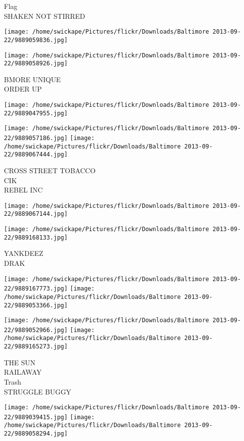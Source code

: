 \documentclass[10pt,letterpaper]{article}
\begin{document}
Flag\\
SHAKEN NOT STIRRED
\pagebreak

\texttt{[image: /home/swickape/Pictures/flickr/Downloads/Baltimore 2013-09-22/9889059836.jpg]}

\vspace{0.25in}
\texttt{[image: /home/swickape/Pictures/flickr/Downloads/Baltimore 2013-09-22/9889058926.jpg]}

BMORE UNIQUE\\
ORDER UP
\pagebreak

\texttt{[image: /home/swickape/Pictures/flickr/Downloads/Baltimore 2013-09-22/9889047955.jpg]}

\vspace{0.25in}
\texttt{[image: /home/swickape/Pictures/flickr/Downloads/Baltimore 2013-09-22/9889057186.jpg]}
\texttt{[image: /home/swickape/Pictures/flickr/Downloads/Baltimore 2013-09-22/9889067444.jpg]}

CROSS STREET TOBACCO\\
CIK\\
REBEL INC
\pagebreak

\texttt{[image: /home/swickape/Pictures/flickr/Downloads/Baltimore 2013-09-22/9889067144.jpg]}

\vspace{0.25in}
\texttt{[image: /home/swickape/Pictures/flickr/Downloads/Baltimore 2013-09-22/9889168133.jpg]}

YANKDEEZ\\
DRAK
\pagebreak

\texttt{[image: /home/swickape/Pictures/flickr/Downloads/Baltimore 2013-09-22/9889167773.jpg]}
\texttt{[image: /home/swickape/Pictures/flickr/Downloads/Baltimore 2013-09-22/9889053366.jpg]}

\texttt{[image: /home/swickape/Pictures/flickr/Downloads/Baltimore 2013-09-22/9889052966.jpg]}
\texttt{[image: /home/swickape/Pictures/flickr/Downloads/Baltimore 2013-09-22/9889165273.jpg]}

THE SUN\\
RAILAWAY\\
Trash\\
STRUGGLE BUGGY
\pagebreak

\texttt{[image: /home/swickape/Pictures/flickr/Downloads/Baltimore 2013-09-22/9889039415.jpg]}
\texttt{[image: /home/swickape/Pictures/flickr/Downloads/Baltimore 2013-09-22/9889058294.jpg]}
\end{document}
